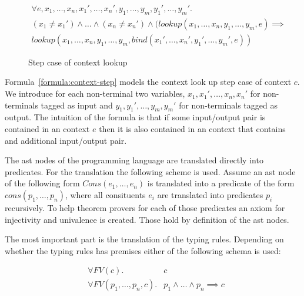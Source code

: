 \begin{figure}
\begin{multline}
  \forall e, x_1, \dots, x_n, x_1', \dots, x_n', y_1, \dots, y_m,
  y_1', \dots,
  y_m' . \\
  (x_1 \neq x_1') \land \dots \land (x_n \neq x_n') \land (lookup(x_1,
  \dots, x_n, y_1, \dots, y_m, e) \implies \\ lookup(x_1, \dots, x_n,
  y_1, \dots, y_m, bind(x_1',\dots,x_n',y_1',\dots,y_m',e))
\label{formula:context-step}
\end{multline}
\caption{Step case of context lookup}
\end{figure}

Formula~\ref{formula:context-step} models the context look up step
case of context $c$. We introduce for each non-terminal two variables,
$x_1,x_1', \dots, x_n,x_n'$ for non-terminals tagged as input and
$y_1,y_1', \dots, y_m,y_m'$ for non-terminals tagged as output. The
intuition of the formula is that if some input/output pair is
contained in an context $e$ then it is also contained in an context
that contains and additional input/output pair. 

The \gls{ast} nodes of the programming language are translated directly into
predicates. For the translation the following scheme is used. Assume
an \gls{ast} node of the following form $Cons(e_1, \dots, e_n)$ is
translated into a predicate of the form $cons(p_1, \dots, p_n)$, where
all consituents $e_i$ are translated into predicates $p_i$
recursively. To help theorem provers for each of those predicates an
axiom for injectivity and univalence is created. Those hold by
definition of the \gls{ast} nodes.

The most important part is the translation of the typing
rules. Depending on whether the typing rules has premises either of
the following schema is used:

\begin{figure}
\label{formula:typing-rule}
\begin{align}
  &\forall FV(c) .& c \\
  &\forall FV(p_1,\dots, p_n, c) .& p_1 \land \dots \land p_n \implies c
\end{align}
\end{figure}

